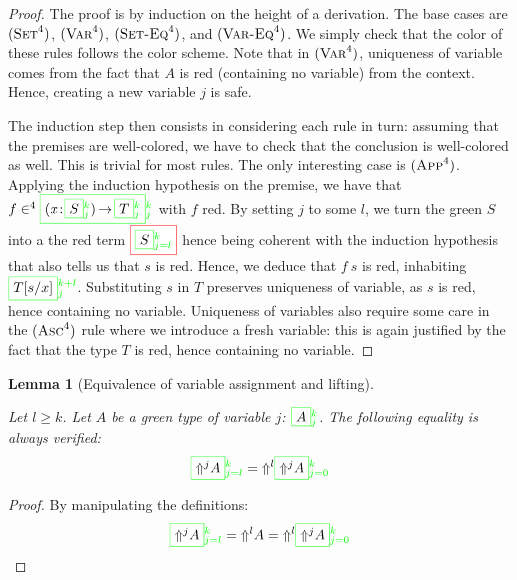 \documentclass[preprint
              , authoryear
              , onecolumn
              ]{sigplanconf}
\newtheorem{lemma}{Lemma}
\newcommand{\redb}[1]{\fcolorbox{red}{white}{$#1$}}
\newcommand{\greenb}[3]{\fcolorbox{green}{white}{$#1$}_{\textcolor{green}{#2}}^{\textcolor{green}{#3}}}
\newcommand{\ruleName}[2]{(\mathrm{\textsc{#1}}^{#2})}
\newcommand{\ruleSet}[1]{\ruleName{Set}{#1}}
\newcommand{\ruleVar}[1]{\ruleName{Var}{#1}}
\newcommand{\ruleAsc}[1]{\ruleName{Asc}{#1}}
\newcommand{\ruleApp}[1]{\ruleName{App}{#1}}
\newcommand{\ruleSetEq}[1]{\ruleName{Set-Eq}{#1}}
\newcommand{\ruleVarEq}[1]{\ruleName{Var-Eq}{#1}}
\begin{document}
\begin{proof}

The proof is by induction on the height of a derivation. The base
cases are $\ruleSet{4}$, $\ruleVar{4}$, $\ruleSetEq{4}$, and
$\ruleVarEq{4}$. We simply check that the color of these rules follows
the color scheme. Note that in $\ruleVar{4}$, uniqueness of variable
comes from the fact that $A$ is red (containing no variable) from the
context. Hence, creating a new variable $j$ is safe.

The induction step then consists in considering each rule in turn:
assuming that the premises are well-colored, we have to check that the
conclusion is well-colored as well. This is trivial for most
rules. The only interesting case is $\ruleApp{4}$. Applying the
induction hypothesis on the premise, we have that
$\pullN{f}{4}{\greenb{\PI{\V{x}}{\greenb{S}{j}{k}}{\greenb{T}{j}{k}}}{j}{k}}$
with $f$ red. By setting $j$ to some $l$, we turn the green $S$ into a
the red term $\redb{\greenb{S}{j=l}{k}}$ hence being coherent with the
induction hypothesis that also tells us that $s$ is red. Hence, we
deduce that $f\: s$ is red, inhabiting
$\greenb{T[s/x]}{j}{k+l}$. Substituting $s$ in $T$ preserves
uniqueness of variable, as $s$ is red, hence containing no
variable. Uniqueness of variables also require some care in the
$\ruleAsc{4}$ rule where we introduce a fresh variable: this is again
justified by the fact that the type $T$ is red, hence containing no
variable.

\end{proof}


\begin{lemma}[Equivalence of variable assignment and lifting]
\label{lemma:lifting-var-assgnmt}

Let $l \geq k$. Let $A$ be a green type of variable $j$:
$\greenb{A}{j}{k}$. The following equality is always verified:
$$
\greenb{\Up{j}{A}}{j=l}{k} = \Up{l}{\greenb{\Up{j}{A}}{j=0}{k}}
$$

\end{lemma}


\begin{proof}

By manipulating the definitions:
$$
\greenb{\Up{j}{A}}{j=l}{k} = \Up{l}{A} = \Up{l}{\greenb{\Up{j}{A}}{j=0}{k}}
$$

\end{proof}
\end{document}
